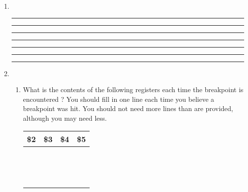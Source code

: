 \documentclass[a4paper,10pt]{article}
\begin{document}
\begin{enumerate}
\item~

\vspace{7mm}\hrule\vspace{7mm}\hrule\vspace{7mm}\hrule\vspace{7mm}\hrule
\vspace{7mm}\hrule\vspace{7mm}\hrule\vspace{7mm}\hrule\vspace{3mm}

\item

\begin{enumerate}
 \item What is the contents of the following registers each time the
breakpoint is encountered ? You should fill in one line each time you
believe a breakpoint was hit. You should not need more lines than are
provided, although you may need less.

\begin{center}
\begin{tabular}{|c|c|c|c|}
\hline\hspace{8mm}\textbf{\$2}\hspace{8mm} & \hspace{8mm}\textbf{\$3}\hspace{8mm} & \hspace{8mm}\textbf{\$4}\hspace{8mm} & \hspace{8mm}\textbf{\$5}\hspace{8mm} \\
\hline & & & \\ & & & \\
\hline & & & \\ & & & \\
\hline & & & \\ & & & \\
\hline & & & \\ & & & \\
\hline & & & \\ & & & \\
\hline & & & \\ & & & \\
\hline & & & \\ & & & \\
\hline

\end{tabular}
\end{center}


\end{enumerate}
\end{enumerate}
\end{document}
